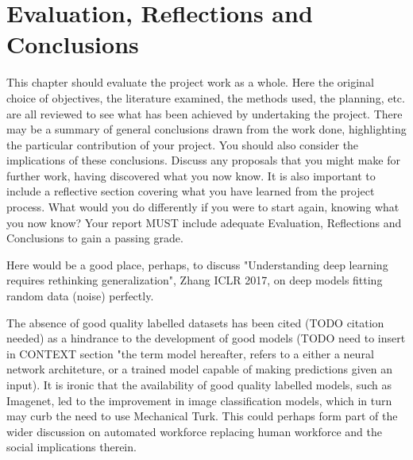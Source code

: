 
\chapter{Evaluation, Reflections and Conclusions}

\label{Eval} 

This chapter should evaluate the project work as a whole. Here the original choice of objectives, the literature examined, the methods used, the planning, etc. are all reviewed to see what has been achieved by undertaking the project. There may be a summary of general conclusions drawn from the work done, highlighting the particular contribution of your project. You should also consider the implications of these conclusions. Discuss any proposals that you might make for further work, having discovered what you now know. It is also important to include a reflective section covering what you have learned from the project process. What would you do differently if you were to start again, knowing what you now know? Your report MUST include adequate Evaluation, Reflections and Conclusions to gain a passing grade.  

Here would be a good place, perhaps, to discuss "Understanding deep learning requires rethinking generalization", Zhang ICLR 2017, on deep models fitting random data (noise) perfectly.

The absence of good quality labelled datasets has been cited (TODO citation needed) as a hindrance to the development of good models (TODO need to insert in CONTEXT section "the term model hereafter, refers to a either a neural network architeture, or a trained model capable of making predictions given an input). It is ironic that the availability of good quality labelled models, such as Imagenet, led to the improvement in image classification models, which in turn may curb the need to use Mechanical Turk. This could perhaps form part of the wider discussion on automated workforce replacing human workforce and the social implications therein.  